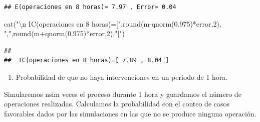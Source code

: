 \documentclass[
]{book}
\newenvironment{Shaded}{\begin{snugshade}}{\end{snugshade}}
\newcommand{\DecValTok}[1]{\textcolor[rgb]{0.00,0.00,0.81}{#1}}
\newcommand{\FloatTok}[1]{\textcolor[rgb]{0.00,0.00,0.81}{#1}}
\newcommand{\FunctionTok}[1]{\textcolor[rgb]{0.00,0.00,0.00}{#1}}
\newcommand{\NormalTok}[1]{#1}
\newcommand{\SpecialCharTok}[1]{\textcolor[rgb]{0.00,0.00,0.00}{#1}}
\newcommand{\StringTok}[1]{\textcolor[rgb]{0.31,0.60,0.02}{#1}}
\providecommand{\tightlist}{%
  \setlength{\itemsep}{0pt}\setlength{\parskip}{0pt}}
\theoremstyle{definition}
\theoremstyle{definition}
\theoremstyle{definition}
\theoremstyle{definition}
\theoremstyle{remark}
\begin{document}
\begin{verbatim}
## E(operaciones en 8 horas)= 7.97 , Error= 0.04
\end{verbatim}

\begin{Shaded}
\begin{Highlighting}[]
\FunctionTok{cat}\NormalTok{(}\StringTok{"}\SpecialCharTok{\textbackslash{}n}\StringTok{ IC(operaciones en 8 horas)=["}\NormalTok{,}\FunctionTok{round}\NormalTok{(m}\SpecialCharTok{{-}}\FunctionTok{qnorm}\NormalTok{(}\FloatTok{0.975}\NormalTok{)}\SpecialCharTok{*}\NormalTok{error,}\DecValTok{2}\NormalTok{),}
    \StringTok{","}\NormalTok{,}\FunctionTok{round}\NormalTok{(m}\SpecialCharTok{+}\FunctionTok{qnorm}\NormalTok{(}\FloatTok{0.975}\NormalTok{)}\SpecialCharTok{*}\NormalTok{error,}\DecValTok{2}\NormalTok{),}\StringTok{"]"}\NormalTok{)}
\end{Highlighting}
\end{Shaded}

\begin{verbatim}
## 
##  IC(operaciones en 8 horas)=[ 7.89 , 8.04 ]
\end{verbatim}

\begin{enumerate}
\def\labelenumi{\arabic{enumi}.}
\setcounter{enumi}{1}
\tightlist
\item
  Probabilidad de que no haya intervenciones en un periodo de 1 hora.
\end{enumerate}

Simularemos nsim veces el proceso durante 1 hora y guardamos el número de operaciones realizadas. Calculamos la probabilidad con el conteo de casos favorables dados por las simulaciones en las que no se produce ninguna operación.
\end{document}
